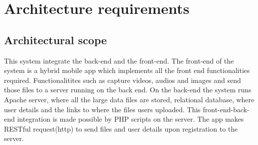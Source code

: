 \documentclass[a4paper,12pt]{article}
\begin{document}
\section{Architecture requirements}
\subsection{Architectural scope}
This system integrate the back-end and the front-end. The front-end of the system is a hybrid mobile app which implements all the front end functionalities required. Functionalitites such as capture videos, audios and images and send those files to a server running on the back end. On the back-end the system runs Apache server, where all the large data files are stored, relational database, where user details and the links to where the files users uploaded. This front-end-back-end integration is made possible by PHP scripts on the server. The app makes RESTful request(http) to send files and user details upon registration to the server.  
\end{document}
